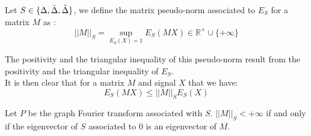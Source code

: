 \documentclass[12pt]{article}
\begin{document}
\begin{definition}
    Let $S \in \{\Delta, \bar{\Delta}, \Tilde{\Delta}\}$, we define the matrix pseudo-norm associated to $E_S$ for a matrix $M$ as :
    $$
    \left| \left| M \right| \right|_S = \sup_{E_S(X) = 1} E_S(MX) \in \mathbb{R}^+\cup\{+\infty\}
    $$
\end{definition}

The positivity and the triangular inequality of this pseudo-norm result from the positivity  and the triangular inequality of $E_S$.\\


It is then clear that for a matrix $M$ and signal $X$ that we have:
$$
E_S(M X) \leq \left| \left| M \right| \right|_S E_S(X)
$$

\begin{thm}\label{dirnorm}
    Let $P$ be the graph Fourier transform associated with $S$. $\left| \left| M \right| \right|_S < +\infty$ if and only if the eigenvector of $S$ associated to 0 is an eigenvector of $M$.
\end{thm}
\end{document}
